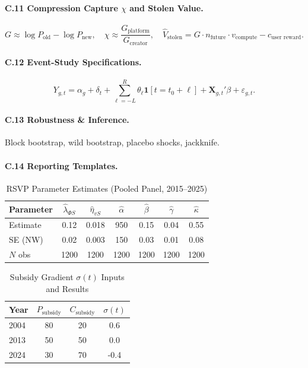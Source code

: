 \documentclass[12pt]{article}
\begin{document}
\paragraph{C.11 Compression Capture \(\chi\) and Stolen Value.}

\[
G \approx \log P_{\text{old}} - \log P_{\text{new}}, \quad \chi \approx \frac{G_{\text{platform}}}{G_{\text{creator}}}, \quad \widehat{V}_{\text{stolen}} = G \cdot n_{\text{future}} \cdot v_{\text{compute}} - c_{\text{user reward}}.
\]

\paragraph{C.12 Event-Study Specifications.}

\[
Y_{g,t} = \alpha_g + \delta_t + \sum_{\ell = -L}^R \theta_\ell \mathbf{1}[t = t_0 + \ell] + \mathbf{X}_{g,t}' \beta + \varepsilon_{g,t}.
\]

\paragraph{C.13 Robustness \& Inference.}

Block bootstrap, wild bootstrap, placebo shocks, jackknife.

\paragraph{C.14 Reporting Templates.}

\begin{table}[h]
\caption{RSVP Parameter Estimates (Pooled Panel, 2015–2025)}
\centering
\begin{tabular}{lcccccc}
\toprule
Parameter & \(\widehat{\lambda}_{\Phi S}\) & \(\widehat{\eta}_{vS}\) & \(\widehat{\alpha}\) & \(\widehat{\beta}\) & \(\widehat{\gamma}\) & \(\widehat{\kappa}\) \\
\midrule
Estimate  & 0.12 & 0.018 & 950 & 0.15 & 0.04 & 0.55 \\
SE (NW)   & 0.02 & 0.003 & 150 & 0.03 & 0.01 & 0.08 \\
\(N\) obs   & 1200 & 1200 & 1200 & 1200 & 1200 & 1200 \\
\bottomrule
\end{tabular}
\end{table}

\begin{table}[h]
\caption{Subsidy Gradient \(\sigma(t)\) Inputs and Results}
\centering
\begin{tabular}{lccc}
\toprule
Year & \(P_{\text{subsidy}}\) & \(C_{\text{subsidy}}\) & \(\sigma(t)\) \\
\midrule
2004 & 80 & 20 & 0.6 \\
2013 & 50 & 50 & 0.0 \\
2024 & 30 & 70 & -0.4 \\
\bottomrule
\end{tabular}
\end{table}
\end{document}
